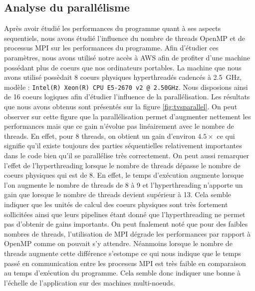 \documentclass[11pt,a4paper]{article}
\begin{document}
	\subsection{Analyse du parallélisme}
		Après avoir étudié les performances du programme quant à ses aspects sequentiels, nous avons étudié l'influence du nombre de threads OpenMP et de processus MPI sur les performances du programme. Afin d'étudier ces paramètres, nous avons utilisé notre accès à AWS afin de profiter d'une machine possédant plus de coeurs que nos ordinateurs portables. La machine que nous avons utilisé possèdait 8 coeurs physiques hyperthreadés cadencés à \SI{2.5}{\giga\hertz}, modèle : \texttt{Intel(R) Xeon(R) CPU E5-2670 v2 @ 2.50GHz}. Nous disposions ainsi de 16 coeurs logiques afin d'étudier l'influence de la parallélisation. Les résultats que nous avons obtenus sont présentés sur la figure \ref{fig:tvsparallel}. On peut observer sur cette figure que la parallélisation permet d'augmenter nettement les performances mais que ce gain n'évolue pas linéairement avec le nombre de threads. En effet, pour 8 threads, on obtient un gain d'environ $4.5\times$ ce qui signifie qu'il existe toujours des parties séquentielles relativement importantes dans le code bien qu'il se parallélise très correctement. On peut aussi remarquer l'effet de l'hyperthreading lorsque le nombre de threads dépasse le nombre de coeurs physiques qui est de 8. En effet, le temps d'exécution augmente lorsque l'on augmente le nombre de threads de 8 à 9 et l'hyperthreading n'apporte un gain que lorsque le nombre de threads devient supérieur à 13. Cela semble indiquer que les unités de calcul des coeurs physiques sont très fortement sollicitées ainsi que leurs pipelines étant donné que l'hyperthreading ne permet pas d'obtenir de gains importants. On peut fnalement noté que pour des faibles nombres de threads, l'utilisation de MPI dégrade les performances par rapport à OpenMP comme on pouvait s'y attendre. Néanmoins lorsque le nombre de threads augmente cette différence s'estompe ce qui nous indique que le temps passé en communication entre les processus MPI est très faible en comparaison au temps d'exécution du programme. Cela semble donc indiquer une bonne à l'échelle de l'application sur des machines multi-noeuds.
\end{document}
